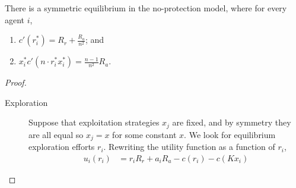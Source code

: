 \begin{proposition}
    There is a symmetric equilibrium in the no-protection model, where for every agent $i$, 
    \begin{enumerate}
        \item  $c'(r^*_i)=R_r+\frac{R_a}{n^2}$; and 
        \item $x^*_i c'(n\cdot r^*_i x^*_i)= \frac{n-1}{n^2}R_a$.
    \end{enumerate}
\end{proposition}
\begin{proof}
\begin{description}
    \item[Exploration] Suppose that exploitation strategies $x_j$ are fixed, and by symmetry they are all equal so $x_j=x$ for some constant $x$.  We look for equilibrium exploration efforts $r_i$.
    Rewriting the utility function as a function of $r_i$,
    \begin{align*}
        u_i(r_i)&=r_i R_r + a_i R_a - c(r_i) - c(K x_i)
    \end{align*}
    

\end{description}
\end{proof}
